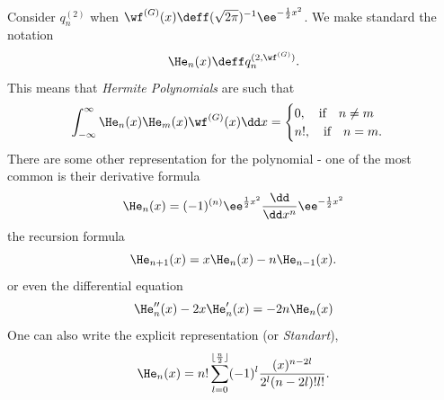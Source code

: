 Consider $q^{(2)}_n$ when $\wf^{(G)}(x) \deff (\sqrt{2\pi})^{-1} \ee^{-\frac{1}{2} x^2}$. We make standard the notation
\begin{equation}
	\He_n(x) \deff q^{(2,\wf^{(G)})}_n.
\end{equation}
This means that \textit{Hermite Polynomials} are such that
\begin{equation}
	\int_{-\infty}^{\infty} \He_n(x) \He_m(x) \wf^{(G)}(x) \dd x = 
	\begin{cases}
		0, \quad \text{if} \quad n \neq m \\
		n!, \quad \text{if} \quad n = m.
	\end{cases}
\end{equation}
There are some other representation for the polynomial - one of the most common is their derivative formula
\begin{equation}
	\He_n(x) = (-1)^{(n)}\ee^{\frac{1}{2} x^2} \frac{\dd}{\dd x^n} \ee^{-\frac{1}{2} x^2}
\end{equation}
the recursion formula 
\begin{equation}
	\He_{n+1}(x) = x \He_n(x) - n \He_{n-1}(x).
\end{equation}
or even the differential equation
\begin{equation}
	\He''_n(x) - 2 x \He'_n(x) = -2 n \He_n(x)
	\label{Equation: Differential equation}
\end{equation}
One can also write the explicit representation (or \textit{Standart}),
\begin{equation}
	\He_{n}(x) = n! \sum_{l=0}^{\lfloor \frac{n}{2} \rfloor} (-1)^{l} \frac{(x)^{n-2l}}{2^l (n-2l)! l!}.
	\label{Equation: Standart Hermite Notation}
\end{equation}

